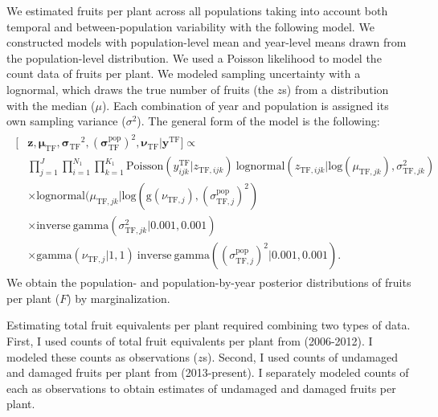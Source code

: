 \documentclass[12pt, oneside, titlepage]{article}   	%
\begin{document}
We estimated fruits per plant across all populations taking into account both temporal and between-population variability with the following model. We constructed models with population-level mean and year-level means drawn from the population-level distribution. We used a Poisson likelihood to model the count data of fruits per plant. We modeled sampling uncertainty with a lognormal, which draws the true number of fruits (the $z$s) from a distribution with the median ($\mu$). Each combination of year and population is assigned its own sampling variance ($\sigma^2$). The general form of the model is the following: 
%
\begin{align}
  \begin{split}
  [ &  \bm{z} ,  \bm{\mu_{\mathrm{TF}}} ,  \bm{\sigma_{\mathrm{TF}}}^2 , ( \bm{\sigma^\mathrm{pop}_{\mathrm{TF}}})^2, \bm{\nu_{\mathrm{TF}}}  |  \bm{y^{\mathrm{TF}}} ]  \propto  \\  
 	     & \prod_{j=1}^{J} \prod_{i=1}^{N_1}  \prod_{k=1}^{K_1}  \mathrm{Poisson} ( y^\mathrm{TF}_{ijk} | z_{\mathrm{TF},ijk} )\ \mathrm{lognormal} ( z_{\mathrm{TF},ijk} | \mathrm{log}(\mu_{\mathrm{TF},jk}), \sigma^2_{\mathrm{TF},jk} )  \\
	     & \times \mathrm{lognormal} ( \mu_{\mathrm{TF},jk} | \mathrm{log}(\mathrm{g}(\nu_{\mathrm{TF},j}), (\sigma^\mathrm{pop}_{\mathrm{TF},j} )^2)  \\
	     & \times \mathrm{inverse\ gamma} ( \sigma^2_{\mathrm{TF},jk}  | 0.001, 0.001 ) \\
	     & \times \mathrm{gamma} (\nu_{\mathrm{TF},j} | 1 , 1)\  \mathrm{inverse\ gamma} ( (\sigma^\mathrm{pop}_{\mathrm{TF},j} )^2 | 0.001, 0.001 ) .
  \end{split}
\end{align}
%
We obtain the population- and population-by-year posterior distributions of fruits per plant ($F$) by marginalization. 

Estimating total fruit equivalents per plant required combining two types of data. First, I used counts of total fruit equivalents per plant from (2006-2012). I modeled these counts as observations ($z$s). Second, I used counts of undamaged and damaged fruits per plant from (2013-present). I separately modeled counts of each as observations to obtain estimates of undamaged and damaged fruits per plant. 

\end{document}
